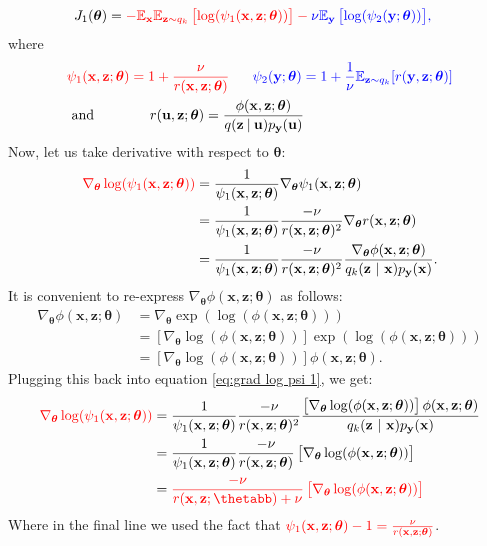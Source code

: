 \documentclass[11pt, oneside]{article}
\newcommand{\thetab}{{\boldsymbol{\theta}}}
\newcommand{\pnn}{\phi}
\newcommand{\pnoise}{p_{ \mathbf y}}
\renewcommand{\u}{{\mathbf u}}
\newcommand{\x}{{\mathbf x}}
\newcommand{\y}{{\mathbf y}}
\newcommand{\z}{{\mathbf z}}
\newcommand\given[1][]{\:#1\vert\:}
\theoremstyle{definition}
\begin{document}
{\begin{align}
J_1(\thetab) & =  
              \color{red}{ - \mathbb{E}_{\x} \mathbb{E}_{\z \sim q_k} \left[ \log(\psi_1(\x, \z; \thetab)) \right]} -        \color{blue}{ \nu \mathbb{E}_{\y}  \left[  \log(\psi_2(\y; \thetab)) \right]},
\end{align}
where
\begin{align}
&\color{red}{\psi_1(\x, \z; \thetab) = 1 + \frac{\nu}{r(\x, \z; \thetab)}} \ \ \ \ \ \color{blue}{\psi_2(\y; \thetab) = 1 + \frac{1}{\nu} \mathbb{E}_{\z \sim q_k}[r(\y, \z; \thetab)]} \\
&\text{ and } \ \ \ \ \ \ \ \ \ \ \ r(\u, \z; \thetab) = \frac{\pnn(\x, \z ; \thetab)}{q(\z \given \u) \pnoise(\u)}
\end{align}
Now, let us take derivative with respect to $\thetab$:
\begin{align}
\color{red}{ \nabla_{\thetab} \log(\psi_1(\x, \z; \thetab))}
           & = \frac{1}{\psi_1(\x, \z; \thetab)} \nabla_{\thetab} \psi_1(\x, \z; \thetab) \\
           & = \frac{1}{\psi_1(\x, \z; \thetab)} \frac{-\nu}{r(\x, \z; \thetab)^2} \nabla_{\thetab} r(\x, \z; \thetab) \\
           & = \frac{1}{\psi_1(\x, \z; \thetab)} \frac{-\nu}{r(\x, \z; \thetab)^2} \frac{\nabla_{\thetab} \phi(\x, \z; \thetab)}{q_k(\z \ | \ \x)p_{\y}(\x)}.
           \label{eq:grad log psi 1}
\end{align}
It is convenient to re-express $\nabla_{\thetab} \phi(\x, \z; \thetab)$ as follows:
\begin{align}
\nabla_{\thetab} \phi(\x, \z; \thetab) & = \nabla_{\thetab} \exp ( \log ( \phi(\x, \z; \thetab) ) ) \\
          & = \left[ \nabla_{\thetab} \log(\phi(\x, \z; \thetab)) \right] \exp ( \log ( \phi(\x, \z; \thetab) ) )\\
          & = \left[ \nabla_{\thetab} \log(\phi(\x, \z; \thetab)) \right] \phi(\x, \z; \thetab).
\end{align}
Plugging this back into equation \ref{eq:grad log psi 1}, we get:
\begin{align}
\color{red}{ \nabla_{\thetab} \log(\psi_1(\x, \z; \thetab))}
    & = \frac{1}{\psi_1(\x, \z; \thetab)}
        \frac{-\nu}{r(\x, \z; \thetab)^2}
        \frac{\left[ \nabla_{\thetab} \log(\phi(\x, \z; \thetab)) \right] \phi(\x, \z; \thetab)}{q_k(\z \ | \ \x)p_{\y}(\x)} \\
    & = \frac{1}{\psi_1(\x, \z; \thetab)}
        \frac{-\nu}{r(\x, \z; \thetab)}
        \left[ \nabla_{\thetab} \log(\phi(\x, \z; \thetab)) \right] \\
    & = \color{red}\frac{- \nu}{r(\x, \z ; \thetabb) + \nu}
        \left[ \nabla_{\thetab} \log(\phi(\x, \z; \thetab)) \right] \\
\end{align}
Where in the final line we used the fact that $\color{red}{\psi_1(\x, \z; \thetab) - 1 = \frac{\nu}{r(\x, \z; \thetab)}}$.

}
\end{document}

